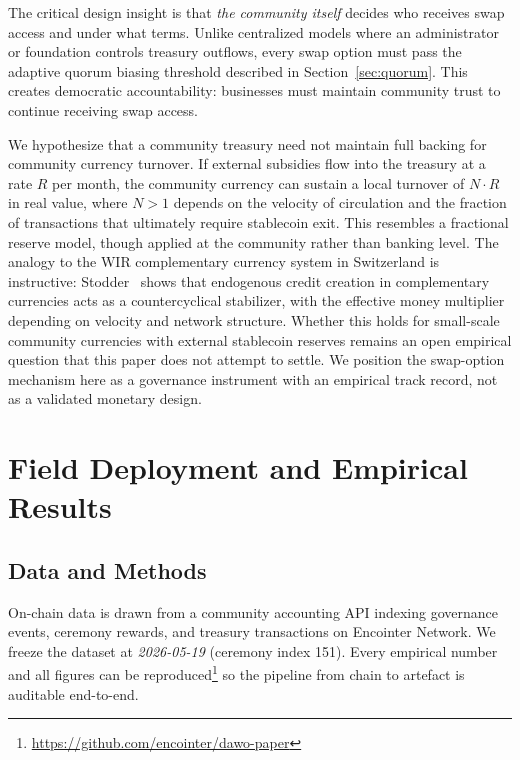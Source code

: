 \documentclass{svproc}
\newcommand{\projchain}{Encointer Network\xspace}
\begin{document}
The critical design insight is that \emph{the community itself} decides who receives swap access and under what terms. Unlike centralized models where an administrator or foundation controls treasury outflows, every swap option must pass the adaptive quorum biasing threshold described in Section~\ref{sec:quorum}. This creates democratic accountability: businesses must maintain community trust to continue receiving swap access.

We hypothesize that a community treasury need not maintain full backing for community currency turnover. If external subsidies flow into the treasury at a rate $R$ per month, the community currency can sustain a local turnover of $N \cdot R$ in real value, where $N > 1$ depends on the velocity of circulation and the fraction of transactions that ultimately require stablecoin exit. This resembles a fractional reserve model, though applied at the community rather than banking level. The analogy to the WIR complementary currency system in Switzerland is instructive: Stodder~\cite{stodder2009} shows that endogenous credit creation in complementary currencies acts as a countercyclical stabilizer, with the effective money multiplier depending on velocity and network structure. Whether this holds for small-scale community currencies with external stablecoin reserves remains an open empirical question that this paper does not attempt to settle. We position the swap-option mechanism here as a governance instrument with an empirical track record, not as a validated monetary design.

\section{Field Deployment and Empirical Results}
\label{sec:results}

\subsection{Data and Methods}
\label{sec:methods}
On-chain data is drawn from a community accounting API indexing governance events, ceremony rewards, and treasury transactions on \projchain. We freeze the dataset at \emph{2026-05-19} (ceremony index 151).
Every empirical number and all figures can be reproduced\footnote{\url{https://github.com/encointer/dawo-paper}} so the pipeline from chain to artefact is auditable end-to-end.
\end{document}

